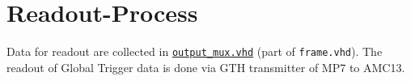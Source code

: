 \section{Readout-Process}

Data for readout are collected in \href{https://github.com/cms-l1-globaltrigger/mp7_ugt_legacy/tree/master/firmware/hdl/payload/frame/output_mux.vhd}{\texttt{output\_mux.vhd}} (part of \texttt{frame.vhd}).
The readout of Global Trigger data is done via GTH transmitter of MP7 to AMC13.

\clearpage
